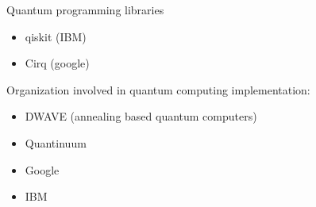 \documentclass[12pt]{article}
\begin{document}
Quantum programming libraries
\begin{itemize}
\item qiskit (IBM)
\item Cirq (google)
\end{itemize}

Organization involved in quantum computing implementation:
\begin{itemize}
\item DWAVE (annealing based quantum computers)
\item Quantinuum
\item Google
\item IBM
\end{itemize}
\end{document}
